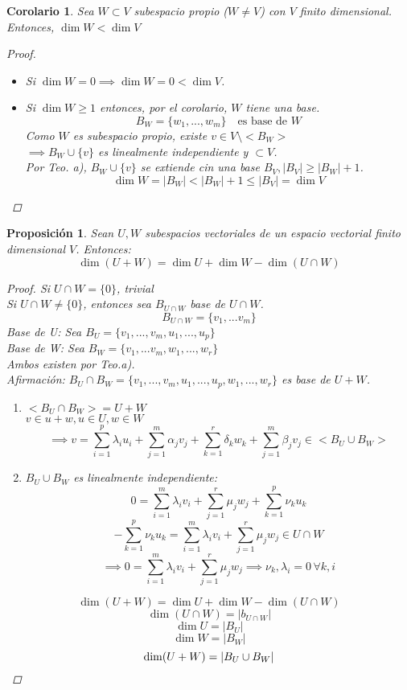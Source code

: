 \documentclass[11pt]{book}
\newtheorem{prop}[thm]{Proposición}
\newtheorem*{cor}{Corolario}
\theoremstyle{definition}
\begin{document}
\begin{cor}
	Sea $W\subset V$ subespacio propio ($W\neq V$) con $V$ finito dimensional.
	Entonces, $\dim W< \dim V$
	\begin{proof}
		\begin{itemize}
			\item Si $\dim W=0\implies \dim W=0<\dim V$.

			\item Si $\dim W\geq 1$ entonces, por el corolario, $W$ tiene una base.
			      \[
				      B_W=\{w_1,...,w_m\}\quad\textrm{es base de } W
			      \]
			      Como $W$ es subespacio propio, existe $v\in V\setminus<B_W>$\\
			      $\implies B_W\cup\{v\}$ es linealmente independiente y $\subset V$.\\
			      Por Teo. a), $B_W\cup\{v\}$ se extiende cin una base $B_V,|B_V|\geq|B_W|+1$.
			      \[
				      \dim W=|B_W|<|B_W|+1\leq |B_V|=\dim V
			      \]
		\end{itemize}
	\end{proof}
\end{cor}


\begin{prop}
	Sean $U,W$ subespacios vectoriales de un espacio vectorial finito dimensional $V$. Entonces:
	\[
		\dim (U+W)=\dim U+\dim W-\dim (U\cap W)
	\]
	\begin{proof}
		Si $U\cap W=\{0\}$, trivial\\
		Si $U\cap W\neq\{0\}$, entonces sea $B_{U\cap W}$ base de $U\cap W$.
		\[
			B_{U\cap W}=\{v_1,...v_m\}
		\]
		Base de U: Sea $B_U=\{v_1,...,v_m,u_1,...,u_p\}$\\
		Base de W: Sea $B_W=\{v_1,...v_m,w_1,...,w_r\}$\\
		Ambos existen por Teo.a).\\
		Afirmación: $B_U\cap B_W=\{v_1,...,v_m,u_1,...,u_p,w_1,...,w_r\}$ es base de $U+W$.
		\begin{enumerate}
			\item $<B_U\cap B_W>=U+W$\\
			      $v\in u+w,u\in U,w\in W$
			      \[
				      \implies v=\sum^{p}_{i=1}\lambda_i u_i+\sum^{m}_{j=1}\alpha_j v_j+\sum^{r}_{k=1}\delta_k w_k+\sum^{m}_{j=1}\beta_j v_j\in<B_U\cup B_W>
			      \]

			\item $B_U\cup B_W$ es linealmente independiente:
			      \[
				      0=\sum^{m}_{i=1}\lambda_i v_i+\sum^{r}_{j=1}\mu_j w_j+\sum^{p}_{k=1}\nu_k u_k
			      \]
			      \[
				      -\sum^{p}_{k=1}\nu_k u_k=\sum^{m}_{i=1}\lambda_i v_i+\sum^{r}_{j=1}\mu_j w_j \in U\cap W
			      \]
			      \[
				      \implies 0=\sum^{m}_{i=1}\lambda_i v_i+\sum^{r}_{j=1}\mu_j w_j\implies \nu_k,\lambda_i=0\,\forall k,i
			      \]
		\end{enumerate}
		\[\dim(U+W)=\dim U+\dim W-\dim(U\cap W)\]
		\[\dim(U\cap W)=|b_{U\cap W}|\]
		\[\dim U=|B_U|\]
		\[\dim W=|B_W|\]
		\[\dim(U+W)=|B_U\cup B_W|\qedhere\]
	\end{proof}
\end{prop}
\end{document}
